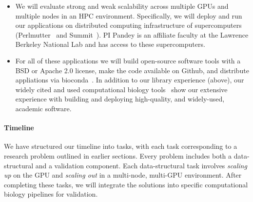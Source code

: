 \begin{itemize}
  \item We will evaluate strong and weak scalability across multiple GPUs and multiple nodes in an HPC environment. Specifically, we will deploy and run our applications on distributed computing infrastructure of supercomputers (Perlmutter~\cite{perlmutter} and Summit~\cite{summit}). PI Pandey is an affiliate faculty at the Lawrence Berkeley National Lab and has access to these supercomputers.
  \item For all of these applications we will build open-source software tools with a BSD or Apache 2.0 license, make the code available on Github, and distribute appliations via bioconda~\cite{Gr_ning_2018}. In addition to our library experience (above), our widely cited and used computational biology tools~\cite{PandeyAlBe18,PandeyBJP17,PandeyBeJo17b,PandeyBeJo18,pandey2020timely,pandey2021variantstore,pandey2021terrace,PandeyBeCo23,Patro2017Salmon,he2022alevin,He2023,Khan2022} show our extensive experience with building and deploying high-quality, and widely-used, academic software.
\end{itemize}

%

\paragraph{Timeline} 
We have structured our timeline into tasks, with each task corresponding to a research problem outlined in earlier sections. Every problem includes both a data-structural and a validation component. Each data-structural task involves \emph{scaling up} on the GPU and \emph{scaling out} in a multi-node, multi-GPU environment. After completing these tasks, we will integrate the solutions into specific computational biology pipelines for validation.

%



